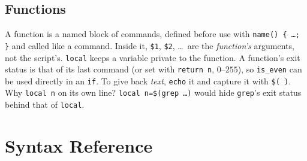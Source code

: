 \documentclass[11pt,a4paper]{article}
\newcommand{\cmd}[1]{\texttt{#1}}
\begin{document}
\subsection{Functions}




A function is a named block of commands, defined before use with \texttt{name() \{ \ldots; \}} and called like a command. Inside it, \texttt{\$1}, \texttt{\$2}, \ldots\ are the \emph{function's} arguments, not the script's. \texttt{local} keeps a variable private to the function. A function's exit status is that of its last command (or set with \texttt{return n}, $0$--$255$), so \texttt{is\_even} can be used directly in an \texttt{if}. To give back \emph{text}, \texttt{echo} it and capture it with \texttt{\$( )}. Why \texttt{local n} on its own line? \texttt{local n=\$(grep \ldots)} would hide \cmd{grep}'s exit status behind that of \texttt{local}.

\section{Syntax Reference}
\end{document}
